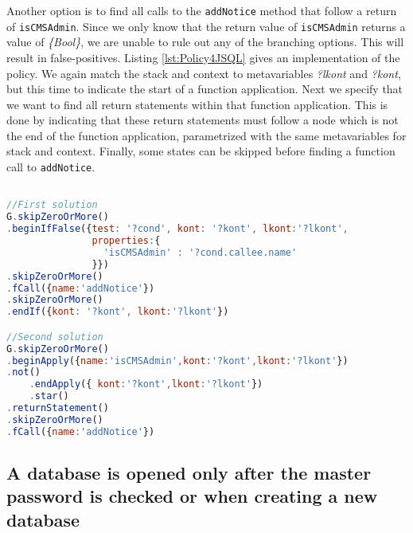 Another option is to find all calls to the \texttt{addNotice} method that follow a return of \texttt{isCMSAdmin}. Since we only know that the return value of \texttt{isCMSAdmin} returns a value of \textit{\{Bool\}}, we are unable to rule out any of the branching options. This will result in false-positives. Listing \ref{lst:Policy4JSQL} gives an implementation of the policy. We again match the stack and context to metavariables \textit{?lkont} and \textit{?kont}, but this time to indicate the start of a function application. Next we specify that we want to find all return statements within that function application. This is done by indicating that these return statements must follow a node which is not the end of the function application, parametrized with the same metavariables for stack and context. Finally, some states can be skipped before finding a function call to \texttt{addNotice}.

\begin{lstlisting}[label={lst:Policy4JSQL},language=JavaScript,caption=Policy 4 in JS-QL]  % float=t?

//First solution
G.skipZeroOrMore()
.beginIfFalse({test: '?cond', kont: '?kont', lkont:'?lkont', 
               properties:{
                 'isCMSAdmin' : '?cond.callee.name'
               }})
.skipZeroOrMore()
.fCall({name:'addNotice'})
.skipZeroOrMore()
.endIf({kont: '?kont', lkont:'?lkont'})

//Second solution
G.skipZeroOrMore()
.beginApply({name:'isCMSAdmin',kont:'?kont',lkont:'?lkont'})
.not()
    .endApply({ kont:'?kont',lkont:'?lkont'})
    .star()
.returnStatement()
.skipZeroOrMore()
.fCall({name:'addNotice'})

\end{lstlisting}


\subsection{A database is opened only after the master password
is checked or when creating a new database}


